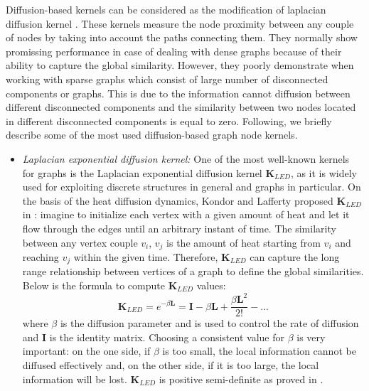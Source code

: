 \documentclass{article}
\begin{document}
Diffusion-based kernels can be considered as the modification of laplacian diffusion kernel \cite{?}. These kernels measure the node proximity between any couple of nodes by taking into account the paths connecting them. They normally show promissing performance in case of dealing with dense graphs because of their ability to capture the global similarity. However, they poorly demonstrate when working with sparse graphs which consist of large number of disconnected components or graphs. This is due to the information cannot diffusion between different disconnected components and the similarity between two nodes located in different disconnected components is equal to zero. Following, we briefly describe some of the most used diffusion-based graph node kernels.
\begin{itemize}
\item \textit{Laplacian exponential diffusion kernel:} One of the most well-known kernels for graphs is the Laplacian exponential diffusion kernel $\textbf{K}_{LED}$, as it is widely used for exploiting discrete structures in general and graphs in particular. On the basis of the heat diffusion dynamics, Kondor and Lafferty proposed $\textbf{K}_{LED}$ in \cite{ledk}: imagine to initialize each vertex with a given amount of heat and let it flow through the edges until an arbitrary instant of time. The similarity between any vertex couple $v_{i}$, $v_{j}$ is the amount of heat starting from $v_{i}$ and reaching $v_{j}$ within the given time. Therefore, $\textbf{K}_{LED}$ can capture the long range relationship between vertices of a graph to define the global similarities. Below is the formula to compute $\textbf{K}_{LED}$ values:
\begin{equation} \label{LEDK-formula}
\textbf{K}_{LED} = e^{-\beta \textbf{L}} = \textbf{I} - \beta \textbf{L} + \frac{\beta \textbf{L}^{2}}{2!} - ...
\end{equation}
where $\beta$ is the diffusion parameter and is used to control the rate of diffusion and $\textbf{I}$ is the identity matrix. Choosing a consistent value for $\beta$ is very important: on the one side, if $\beta$ is too small, the local information cannot be diffused effectively and, on the other side, if it is too large, the local information will be lost. $\textbf{K}_{LED}$ is positive semi-definite as proved in \cite{ledk}.


\end{itemize}
\end{document}
